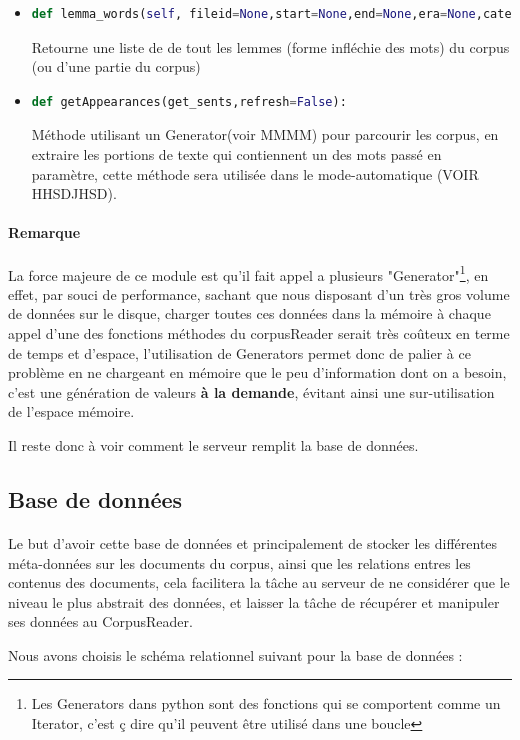 \documentclass[]{report}
\begin{document}
\begin{itemize}
				\item 
				\begin{lstlisting}[language=python]
				def lemma_words(self, fileid=None,start=None,end=None,era=None,category=None):\end{lstlisting}
				Retourne une liste de de tout les lemmes (forme infléchie des mots) du corpus (ou d'une partie du corpus) 
				
				\item 
				\begin{lstlisting}[language=python]
				def getAppearances(get_sents,refresh=False):\end{lstlisting}
				Méthode utilisant un Generator(voir MMMM) pour parcourir les corpus, en extraire les portions de texte qui contiennent un des mots passé en paramètre, cette méthode sera utilisée dans le mode-automatique (VOIR HHSDJHSD).
			\end{itemize}
			\paragraph{Remarque}
			La force majeure de ce module est qu'il fait appel a plusieurs "Generator"\footnote{Les Generators dans python sont des fonctions qui se comportent comme un Iterator, c'est ç dire qu'il peuvent être utilisé dans une boucle}, en effet, par souci de performance, sachant que nous disposant d'un très gros volume de données sur le disque, charger toutes ces données dans la mémoire à chaque appel d'une des fonctions méthodes du corpusReader serait très coûteux en terme de temps
			et d'espace, l'utilisation de Generators permet donc de palier à ce problème en ne chargeant en mémoire que le peu d'information dont on a besoin, c'est une génération de valeurs \textbf{à la demande}, évitant ainsi une sur-utilisation de l'espace mémoire.
			
			\par
			Il reste donc à voir comment le serveur remplit la base de données. 
		\subsection{Base de données}
			\paragraph{}
			Le but d'avoir cette base de données et principalement de stocker les différentes méta-données sur les documents du corpus, ainsi que les relations entres les contenus des documents, cela facilitera la tâche au serveur de ne considérer que le niveau le plus abstrait des données, et laisser la tâche de récupérer et manipuler ses données au CorpusReader.
			\par 
			Nous avons choisis le schéma relationnel suivant pour la base de données : 
			
\end{document}
